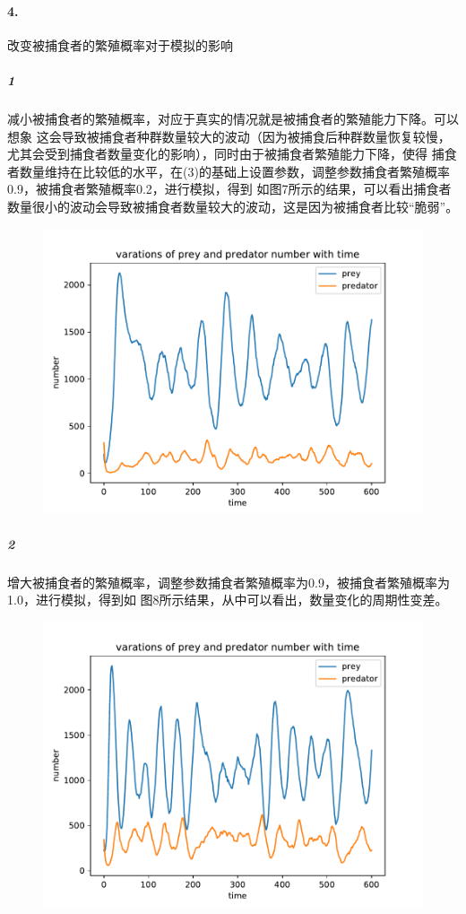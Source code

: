 \documentclass[a4paper]{ctexart}
\begin{document}
	\paragraph{4.}改变被捕食者的繁殖概率对于模拟的影响
	\subparagraph{1}减小被捕食者的繁殖概率，对应于真实的情况就是被捕食者的繁殖能力下降。可以想象
	这会导致被捕食者种群数量较大的波动（因为被捕食后种群数量恢复较慢，尤其会受到捕食者数量变化的影响），同时由于被捕食者繁殖能力下降，使得
	捕食者数量维持在比较低的水平，在(3)的基础上设置参数，调整参数捕食者繁殖概率0.9，被捕食者繁殖概率0.2，进行模拟，得到
	如图7所示的结果，可以看出捕食者数量很小的波动会导致被捕食者数量较大的波动，这是因为被捕食者比较“脆弱”。
	\begin{figure}[htbp]
		\centering
		\includegraphics[scale=0.60]{demo5.pdf}
		\caption{}
	\end{figure}
	\subparagraph{2}增大被捕食者的繁殖概率，调整参数捕食者繁殖概率为0.9，被捕食者繁殖概率为1.0，进行模拟，得到如
	图8所示结果，从中可以看出，数量变化的周期性变差。
	\begin{figure}[htbp]
		\centering
		\includegraphics[scale=0.60]{demo6.pdf}
		\caption{}
	\end{figure}
\end{document}
